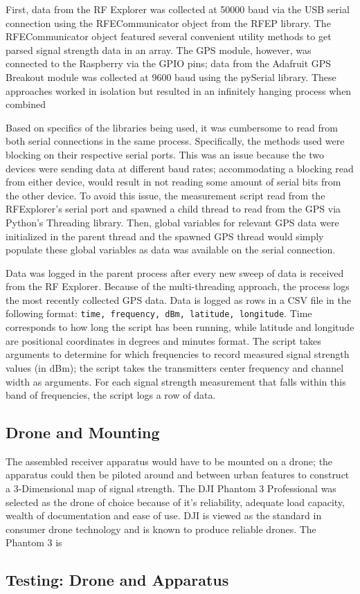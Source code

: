 \documentclass[pageno]{jpaper}
\begin{document}
First, data from the RF Explorer was collected at 50000 baud via the USB serial connection using the RFECommunicator object from the RFEP library. The RFECommunicator object featured several convenient utility methods to get parsed signal strength data in an array. The GPS module, however, was connected to the Raspberry via the GPIO pins; data from the Adafruit GPS Breakout module was collected at 9600 baud using the pySerial library. These approaches worked in isolation but resulted in an infinitely hanging process when combined

Based on specifics of the libraries being used, it was cumbersome to read from both serial connections in the same process. Specifically, the methods used were blocking on their respective serial ports. This was an issue because the two devices were sending data at different baud rates; accommodating a blocking read from either device, would result in not reading some amount of serial bits from the other device. To avoid this issue, the measurement script read from the RFExplorer's serial port and spawned a child thread to read from the GPS via Python's Threading library. Then, global variables for relevant GPS data were initialized in the parent thread and the spawned GPS thread would simply populate these global variables as data was available on the serial connection.

Data was logged in the parent process after every new sweep of data is received from the RF Explorer. Because of the multi-threading approach, the process logs the most recently collected GPS data. Data is logged as rows in a CSV file in the following format: \texttt{time, frequency, dBm, latitude, longitude}. Time corresponds to how long the script has been running, while latitude and longitude are positional coordinates in degrees and minutes format. The script takes arguments to determine for which frequencies to record measured signal strength values (in dBm); the script takes the transmitters center frequency and channel width as arguments. For each signal strength measurement that falls within this band of frequencies, the script logs a row of data.  

\subsection{Drone and Mounting}
The assembled receiver apparatus would have to be mounted on a drone; the apparatus could then be piloted around and between urban features to construct a 3-Dimensional map of signal strength. The DJI Phantom 3 Professional was selected as the drone of choice because of it's reliability, adequate load capacity, wealth of documentation and ease of use. DJI is viewed as the standard in consumer drone technology and is known to produce reliable drones. The Phantom 3 is 

\subsection{Testing: Drone and Apparatus}




\subsection{}
\end{document}
